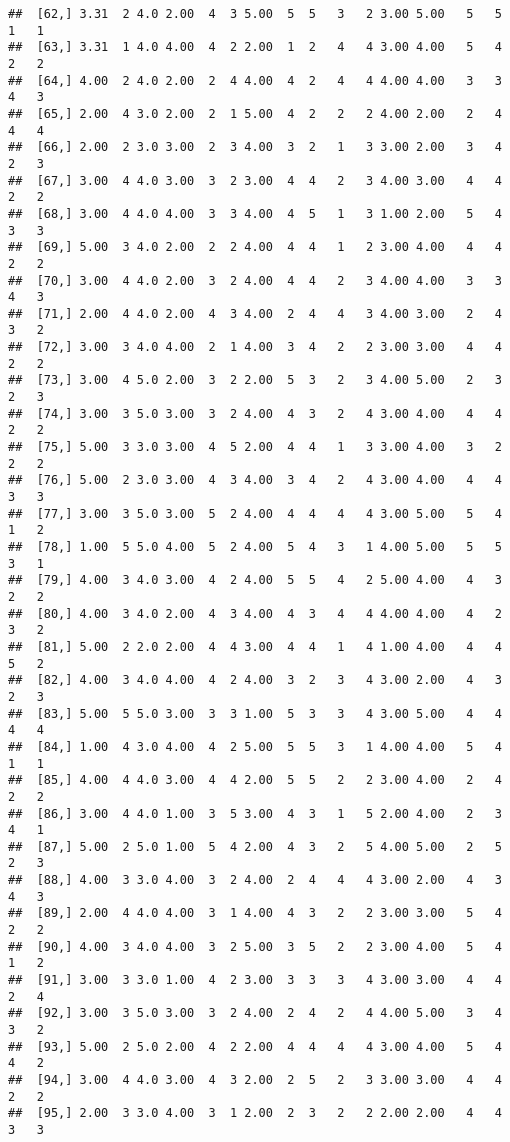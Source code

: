 \documentclass[]{article}
\begin{document}
\begin{verbatim}
##  [62,] 3.31  2 4.0 2.00  4  3 5.00  5  5   3   2 3.00 5.00   5   5   1   1
##  [63,] 3.31  1 4.0 4.00  4  2 2.00  1  2   4   4 3.00 4.00   5   4   2   2
##  [64,] 4.00  2 4.0 2.00  2  4 4.00  4  2   4   4 4.00 4.00   3   3   4   3
##  [65,] 2.00  4 3.0 2.00  2  1 5.00  4  2   2   2 4.00 2.00   2   4   4   4
##  [66,] 2.00  2 3.0 3.00  2  3 4.00  3  2   1   3 3.00 2.00   3   4   2   3
##  [67,] 3.00  4 4.0 3.00  3  2 3.00  4  4   2   3 4.00 3.00   4   4   2   2
##  [68,] 3.00  4 4.0 4.00  3  3 4.00  4  5   1   3 1.00 2.00   5   4   3   3
##  [69,] 5.00  3 4.0 2.00  2  2 4.00  4  4   1   2 3.00 4.00   4   4   2   2
##  [70,] 3.00  4 4.0 2.00  3  2 4.00  4  4   2   3 4.00 4.00   3   3   4   3
##  [71,] 2.00  4 4.0 2.00  4  3 4.00  2  4   4   3 4.00 3.00   2   4   3   2
##  [72,] 3.00  3 4.0 4.00  2  1 4.00  3  4   2   2 3.00 3.00   4   4   2   2
##  [73,] 3.00  4 5.0 2.00  3  2 2.00  5  3   2   3 4.00 5.00   2   3   2   3
##  [74,] 3.00  3 5.0 3.00  3  2 4.00  4  3   2   4 3.00 4.00   4   4   2   2
##  [75,] 5.00  3 3.0 3.00  4  5 2.00  4  4   1   3 3.00 4.00   3   2   2   2
##  [76,] 5.00  2 3.0 3.00  4  3 4.00  3  4   2   4 3.00 4.00   4   4   3   3
##  [77,] 3.00  3 5.0 3.00  5  2 4.00  4  4   4   4 3.00 5.00   5   4   1   2
##  [78,] 1.00  5 5.0 4.00  5  2 4.00  5  4   3   1 4.00 5.00   5   5   3   1
##  [79,] 4.00  3 4.0 3.00  4  2 4.00  5  5   4   2 5.00 4.00   4   3   2   2
##  [80,] 4.00  3 4.0 2.00  4  3 4.00  4  3   4   4 4.00 4.00   4   2   3   2
##  [81,] 5.00  2 2.0 2.00  4  4 3.00  4  4   1   4 1.00 4.00   4   4   5   2
##  [82,] 4.00  3 4.0 4.00  4  2 4.00  3  2   3   4 3.00 2.00   4   3   2   3
##  [83,] 5.00  5 5.0 3.00  3  3 1.00  5  3   3   4 3.00 5.00   4   4   4   4
##  [84,] 1.00  4 3.0 4.00  4  2 5.00  5  5   3   1 4.00 4.00   5   4   1   1
##  [85,] 4.00  4 4.0 3.00  4  4 2.00  5  5   2   2 3.00 4.00   2   4   2   2
##  [86,] 3.00  4 4.0 1.00  3  5 3.00  4  3   1   5 2.00 4.00   2   3   4   1
##  [87,] 5.00  2 5.0 1.00  5  4 2.00  4  3   2   5 4.00 5.00   2   5   2   3
##  [88,] 4.00  3 3.0 4.00  3  2 4.00  2  4   4   4 3.00 2.00   4   3   4   3
##  [89,] 2.00  4 4.0 4.00  3  1 4.00  4  3   2   2 3.00 3.00   5   4   2   2
##  [90,] 4.00  3 4.0 4.00  3  2 5.00  3  5   2   2 3.00 4.00   5   4   1   2
##  [91,] 3.00  3 3.0 1.00  4  2 3.00  3  3   3   4 3.00 3.00   4   4   2   4
##  [92,] 3.00  3 5.0 3.00  3  2 4.00  2  4   2   4 4.00 5.00   3   4   3   2
##  [93,] 5.00  2 5.0 2.00  4  2 2.00  4  4   4   4 3.00 4.00   5   4   4   2
##  [94,] 3.00  4 4.0 3.00  4  3 2.00  2  5   2   3 3.00 3.00   4   4   2   2
##  [95,] 2.00  3 3.0 4.00  3  1 2.00  2  3   2   2 2.00 2.00   4   4   3   3

\end{verbatim}
\end{document}
